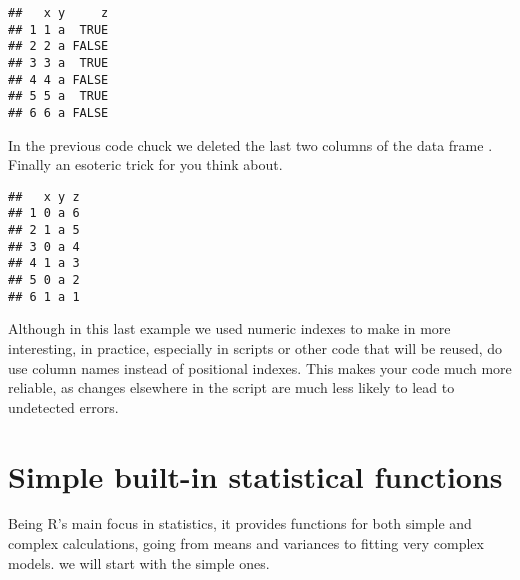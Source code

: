 \documentclass[paper=a4,headsepline,BCOR=12mm,twoside,open=right,%
titlepage,headings=small,fontsize=10pt,index=totoc,bibliography=totoc,%
captions=tableheading,captions=nooneline]{scrbook}\usepackage{knitr}
\begin{document}
\begin{knitrout}\footnotesize
{}\color{fgcolor}\begin{kframe}
\begin{alltt}
\hlstd{a.df[[}\hlstd{]]} \hlkwb{<-} 
\hlopt{$} \hlkwb{<-} 
\end{alltt}
\begin{verbatim}
##   x y     z
## 1 1 a  TRUE
## 2 2 a FALSE
## 3 3 a  TRUE
## 4 4 a FALSE
## 5 5 a  TRUE
## 6 6 a FALSE
\end{verbatim}
\end{kframe}
\end{knitrout}

In the previous code chuck we deleted the last two columns of the data frame .
Finally an esoteric trick for you think about.

\begin{knitrout}\footnotesize
{}\color{fgcolor}\begin{kframe}
\begin{alltt}
\hlstd{a.df[}\hlopt{:}\hlstd{,} \hlstd{(}\hlstd{,}\hlstd{)]} \hlkwb{<-} \hlstd{a.df[}\hlopt{:}\hlstd{,} \hlstd{(}\hlstd{,}\hlstd{)]}
\end{alltt}
\begin{verbatim}
##   x y z
## 1 0 a 6
## 2 1 a 5
## 3 0 a 4
## 4 1 a 3
## 5 0 a 2
## 6 1 a 1
\end{verbatim}
\end{kframe}
\end{knitrout}

Although in this last example we used numeric indexes to make in more interesting, in practice, especially in scripts or other code that will be reused, do use column names instead of positional indexes. This makes your code much more reliable, as changes elsewhere in the script are much less likely to lead to undetected errors.

\section{Simple built-in statistical functions}

Being R's main focus in statistics, it provides functions for both simple and complex calculations, going from means and variances to fitting very complex models. we will start with the simple ones.
\end{document}
